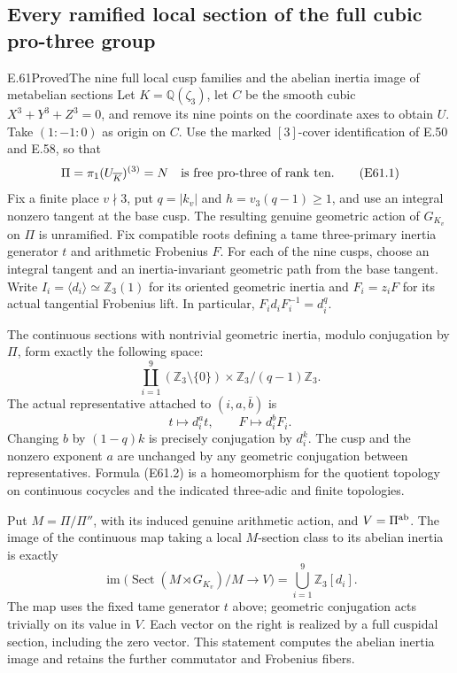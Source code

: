 \subsection{Every ramified local section of the full cubic pro-three group}

\begin{statement}{E.61}{Proved}{The nine full local cusp families and the abelian inertia image of metabelian sections}
Let $K=\mathbb Q(\zeta_3)$, let $C$ be the smooth cubic
$X^3+Y^3+Z^3=0$, and remove its nine points on the coordinate
axes to obtain $U$. Take $(1:-1:0)$ as origin on $C$.
Use the marked $[3]$-cover identification of E.50 and E.58, so that
\[
 \Pi=\pi_1(U_{\overline K})^{(3)}=N
 \quad\hbox{is free pro-three of rank ten}.
 \tag{E61.1}
\]
Fix a finite place $v\nmid3$, put $q=|k_v|$ and
$h=v_3(q-1)\ge1$, and use an integral nonzero tangent at the
base cusp. The resulting genuine geometric action of $G_{K_v}$
on $\Pi$ is unramified. Fix compatible roots defining a tame
three-primary inertia generator $t$ and arithmetic Frobenius $F$.
For each of the nine cusps, choose an integral tangent and an
inertia-invariant geometric path from the base tangent. Write
$I_i=\langle d_i\rangle\simeq\mathbb Z_3(1)$ for its oriented
geometric inertia and $F_i=z_iF$ for its actual tangential
Frobenius lift. In particular, $F_id_iF_i^{-1}=d_i^q$.

The continuous sections with nontrivial geometric inertia,
modulo conjugation by $\Pi$, form exactly the following space:
\[
 \coprod_{i=1}^{9}
       (\mathbb Z_3\setminus\{0\})\times
             \mathbb Z_3/(q-1)\mathbb Z_3.
 \tag{E61.2}
\]
The actual representative attached to $(i,a,\bar b)$ is
\[
       t\longmapsto d_i^a t,\qquad
       F\longmapsto d_i^bF_i.
 \tag{E61.3}
\]
Changing $b$ by $(1-q)k$ is precisely conjugation by $d_i^k$.
The cusp and the nonzero exponent $a$ are unchanged by any
geometric conjugation between representatives. Formula (E61.2)
is a homeomorphism for the quotient topology on continuous
cocycles and the indicated three-adic and finite topologies.

Put $M=\Pi/\Pi''$, with its induced genuine arithmetic action,
and $V=\Pi^{\rm ab}$. The image of the continuous map taking
a local $M$-section class to its abelian inertia is exactly
\[
 \operatorname{im}\bigl(
   \operatorname{Sect}(M\rtimes G_{K_v})/M
       \longrightarrow V\bigr)
       =\bigcup_{i=1}^{9}\mathbb Z_3[d_i].
 \tag{E61.14}
\]
The map uses the fixed tame generator $t$ above; geometric
conjugation acts trivially on its value in $V$. Each vector
on the right is realized by a full cuspidal section, including
the zero vector. This statement computes the abelian inertia
image and retains the further commutator and Frobenius fibers.


\end{statement}
